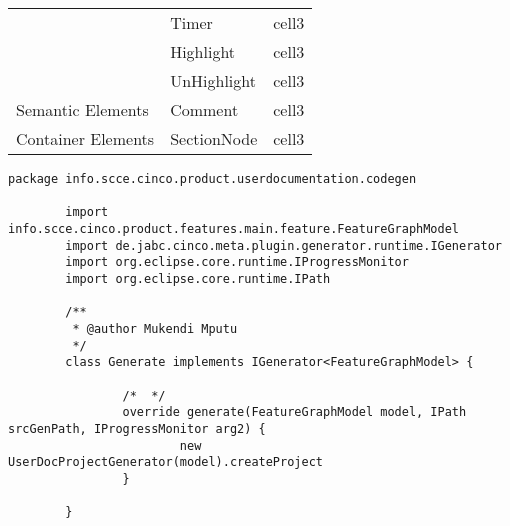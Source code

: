 \begin{table}[H]
\begin{tabular}{| l | l | p{8.2cm} |}
                & Timer & cell3 \\\cline{2-3}
                & Highlight & cell3 \\\cline{2-3}
                & UnHighlight & cell3 \\\cline{2-3}
        \hline\hline
        \multirow{1}{*}{Semantic Elements} 
                & Comment & cell3 \\\cline{2-3}
        \hline\hline
        \multirow{1}{*}{Container Elements} 
                & SectionNode & cell3 \\\cline{2-3}
        \hline
    \end{tabular}
    \label{tab:listOfElements}
\end{table}


\begin{lstlisting}[language=MGL, caption={Generate.xtend clas implementing the IGenerator infterface}, label=generate, escapechar=|]
        package info.scce.cinco.product.userdocumentation.codegen
        
        import info.scce.cinco.product.features.main.feature.FeatureGraphModel
        import de.jabc.cinco.meta.plugin.generator.runtime.IGenerator
        import org.eclipse.core.runtime.IProgressMonitor
        import org.eclipse.core.runtime.IPath
        
        /**
         * @author Mukendi Mputu
         */
        class Generate implements IGenerator<FeatureGraphModel> {
        
                /*	*/
                override generate(FeatureGraphModel model, IPath srcGenPath, IProgressMonitor arg2) {
                        new UserDocProjectGenerator(model).createProject
                }
                
        }
\end{lstlisting}